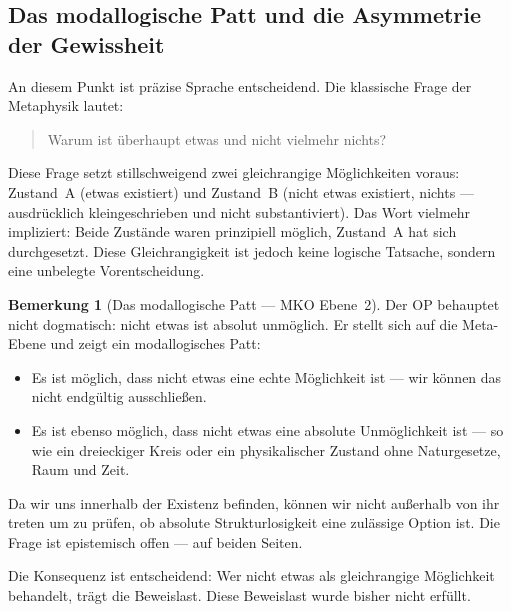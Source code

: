 \documentclass[11pt,a4paper]{article}
\theoremstyle{plain}
\theoremstyle{definition}
\newtheorem{remark}{Bemerkung}[section]
\begin{document}
\subsection{Das modallogische Patt und die Asymmetrie der Gewissheit}

An diesem Punkt ist pr\"{a}zise Sprache entscheidend. Die klassische Frage der Metaphysik
lautet:

\begin{quote}
\glqq{}Warum ist \"{u}berhaupt etwas und nicht vielmehr nichts?\grqq{}
\end{quote}

Diese Frage setzt stillschweigend zwei gleichrangige M\"{o}glichkeiten voraus: Zustand~A
(\glqq{}etwas existiert\grqq{}) und Zustand~B (\glqq{}nicht etwas existiert\grqq{},
\glqq{}nichts\grqq{} --- ausdr\"{u}cklich kleingeschrieben und nicht substantiviert).
Das Wort \glqq{}vielmehr\grqq{} impliziert: Beide Zust\"{a}nde waren prinzipiell m\"{o}glich,
Zustand~A hat sich durchgesetzt. Diese Gleichrangigkeit ist jedoch keine logische Tatsache,
sondern eine unbelegte Vorentscheidung.

\begin{remark}[Das modallogische Patt --- MKO Ebene~2]
Der OP behauptet nicht dogmatisch: \glqq{}nicht etwas ist absolut unm\"{o}glich.\grqq{}
Er stellt sich auf die Meta-Ebene und zeigt ein modallogisches Patt:

\medskip
\begin{itemize}
  \item Es ist m\"{o}glich, dass \glqq{}nicht etwas\grqq{} eine echte M\"{o}glichkeit
        ist --- wir k\"{o}nnen das nicht endg\"{u}ltig ausschlie\ss{}en.
  \item Es ist ebenso m\"{o}glich, dass \glqq{}nicht etwas\grqq{} eine absolute
        Unm\"{o}glichkeit ist --- so wie ein dreieckiger Kreis oder ein physikalischer
        Zustand ohne Naturgesetze, Raum und Zeit.
\end{itemize}

\medskip
Da wir uns innerhalb der Existenz befinden, k\"{o}nnen wir nicht au\ss{}erhalb von ihr
treten um zu pr\"{u}fen, ob absolute Strukturlosigkeit eine zul\"{a}ssige Option ist.
Die Frage ist epistemisch offen --- auf beiden Seiten.

Die Konsequenz ist entscheidend: Wer \glqq{}nicht etwas\grqq{} als gleichrangige
M\"{o}glichkeit behandelt, tr\"{a}gt die Beweislast. Diese Beweislast wurde bisher
nicht erf\"{u}llt.
\end{remark}
\end{document}
